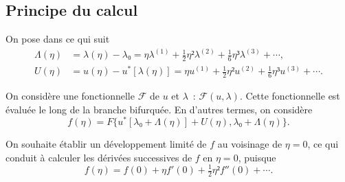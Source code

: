 \documentclass[12pt, final]{scrartcl}
\theoremstyle{definition}
\newcommand{\order}[2][1]{#2^{(#1)}}
\begin{document}
\subsection{Principe du calcul}
\label{sec:20220107121442}
%

On pose dans ce qui suit
\begin{align}
  \label{eq:20211112155446}
  Λ(η) & = λ(η) - λ₀ = η \order[1]λ + \tfrac{1}{2} η² \order[2]λ + \tfrac{1}{6} η³ \order[3]λ + \cdots,\\
  \label{eq:20211112113028}
  U(η) & = u(η) - u^{\ast}[λ(η)] = η \order[1]u + \tfrac{1}{2} η² \order[2]u + \tfrac{1}{6} η³ \order[3]u + \cdots.
\end{align}

On considère une fonctionnelle \(\mathcal{F}\) de \(u\) et \(λ\)~:
\(\mathcal{F}(u, λ)\). Cette fonctionnelle est évaluée le long de la branche
bifurquée. En d'autres termes, on considère
\begin{equation*}
  f(η) = F\{ u^{\ast} [λ₀ + Λ(η)] + U(η), λ₀ + Λ(η) \}.
\end{equation*}

On souhaite établir un développement limité de \(f\) au voisinage de \(η = 0\),
ce qui conduit à calculer les dérivées successives de \(f\) en \(η = 0\),
puisque
\begin{equation*}
  f(η) = f(0) + η f'(0) + \tfrac{1}{2} η² f''(0) + \cdots.
\end{equation*}
\end{document}
